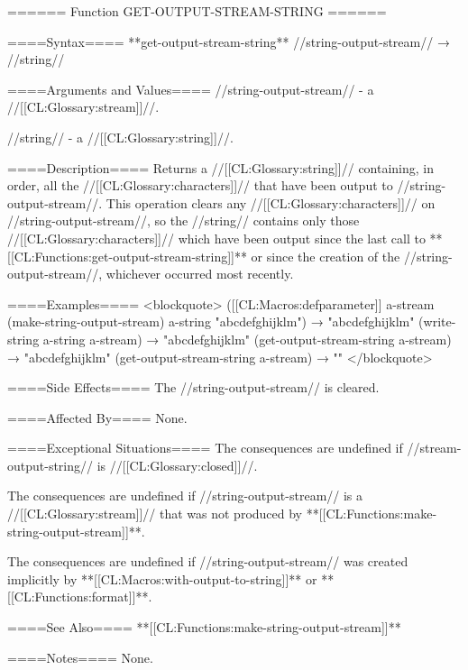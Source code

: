 ====== Function GET-OUTPUT-STREAM-STRING ======

====Syntax====
**get-output-stream-string** //string-output-stream// → //string//

====Arguments and Values====
//string-output-stream// - a //[[CL:Glossary:stream]]//.

//string// - a //[[CL:Glossary:string]]//.

====Description====
Returns a //[[CL:Glossary:string]]// containing, in order, all the //[[CL:Glossary:characters]]// that have been output to //string-output-stream//. This operation clears any //[[CL:Glossary:characters]]// on //string-output-stream//, so the //string// contains only those //[[CL:Glossary:characters]]// which have been output since the last call to **[[CL:Functions:get-output-stream-string]]** or since the creation of the //string-output-stream//, whichever occurred most recently.

====Examples==== <blockquote> ([[CL:Macros:defparameter]] a-stream (make-string-output-stream) a-string "abcdefghijklm") → "abcdefghijklm" (write-string a-string a-stream) → "abcdefghijklm" (get-output-stream-string a-stream) → "abcdefghijklm" (get-output-stream-string a-stream) → "" </blockquote>

====Side Effects====
The //string-output-stream// is cleared.

====Affected By====
None.

====Exceptional Situations====
The consequences are undefined if //stream-output-string// is //[[CL:Glossary:closed]]//.

The consequences are undefined if //string-output-stream// is a //[[CL:Glossary:stream]]// that was not produced by **[[CL:Functions:make-string-output-stream]]**.

The consequences are undefined if //string-output-stream// was created implicitly by **[[CL:Macros:with-output-to-string]]** or **[[CL:Functions:format]]**.

====See Also====
**[[CL:Functions:make-string-output-stream]]**

====Notes====
None.

 
